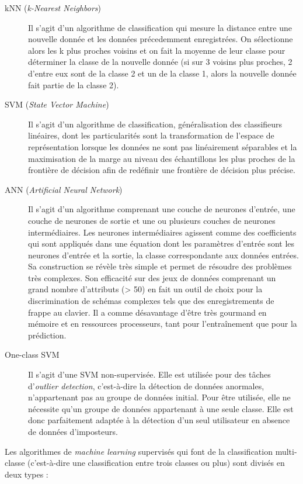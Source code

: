 \begin{description}
  \item[kNN\cite{Hu2008} (\textit{k-Nearest Neighbors})] Il s'agit d'un algorithme de classification qui mesure la distance entre une nouvelle donnée et les données précedemment enregistrées. On sélectionne alors les k plus proches voisins et on fait la moyenne de leur classe pour déterminer la classe de la nouvelle donnée (si sur 3 voisins plus proches, 2 d'entre eux sont de la classe 2 et un de la classe 1, alors la nouvelle donnée fait partie de la classe 2).
  \item[SVM\cite{giotSVM} (\textit{State Vector Machine})] Il s'agit d'un algorithme de classification, généralisation des classifieurs linéaires, dont les particularités sont la transformation de l'espace de représentation lorsque les données ne sont pas linéairement séparables et la maximisation de la marge au niveau des échantillons les plus proches de la frontière de décision afin de redéfinir une frontière de décision plus précise.
  \item[ANN (\textit{Artificial Neural Network})] Il s'agit d'un algorithme comprenant une couche de neurones d'entrée, une couche de neurones de sortie et une ou plusieurs couches de neurones intermédiaires. Les neurones intermédiaires agissent comme des coefficients qui sont appliqués dans une équation dont les paramètres d'entrée sont les neurones d'entrée et la sortie, la classe correspondante aux données entrées. Sa construction se révèle très simple et permet de résoudre des problèmes très complexes. Son efficacité sur des jeux de données comprenant un grand nombre d'attributs (> 50) en fait un outil de choix pour la discrimination de schémas complexes tels que des enregistrements de frappe au clavier. Il a comme désavantage d'être très gourmand en mémoire et en ressources processeurs, tant pour l'entraînement que pour la prédiction.
  \item[One-class SVM\cite{oneclassSVM}] Il s'agit d'une SVM non-supervisée. Elle est utilisée pour des tâches d'\textit{outlier detection}, c'est-à-dire la détection de données anormales, n'appartenant pas au groupe de données initial. Pour être utilisée, elle ne nécessite qu'un groupe de données appartenant à une seule classe. Elle est donc parfaitement adaptée à la détection d'un seul utilisateur en absence de données d'imposteurs.
\end{description}

Les algorithmes de \textit{machine learning} supervisés qui font de la classification multi-classe (c'est-à-dire une classification entre trois classes ou plus) sont divisés en deux types :

